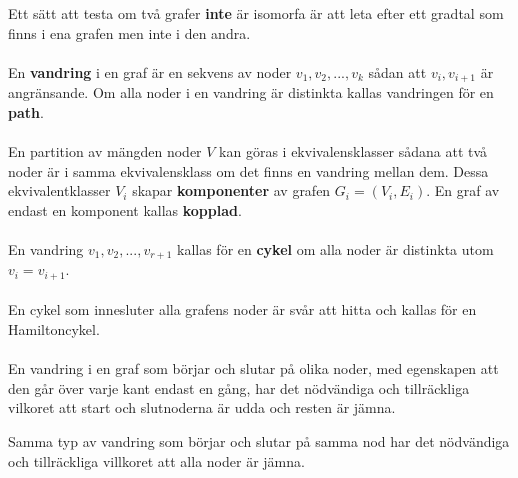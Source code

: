 \documentclass{article}
\begin{document}
Ett sätt att testa om två grafer \textbf{inte} är isomorfa är att leta efter ett gradtal som finns i ena grafen men inte i den andra.\\ \\ 
En \textbf{vandring} i en graf är en sekvens av noder $v_1,v_2,...,v_k$ sådan att $v_i,v_{i+1}$ är angränsande. Om alla noder i en vandring är distinkta kallas vandringen för en \textbf{path}.\\ \\ 
En partition av mängden noder $V$ kan göras i ekvivalensklasser sådana att två noder är i samma ekvivalensklass om det finns en vandring mellan dem. Dessa ekvivalentklasser $V_i$ skapar \textbf{komponenter} av grafen $G_i=(V_i,E_i)$. En graf av endast en komponent kallas \textbf{kopplad}.\\ \\ 
En vandring $v_1,v_2,...,v_{r+1}$ kallas för en \textbf{cykel} om alla noder är distinkta utom $v_i=v_{i+1}$.\\ \\ 
En cykel som innesluter alla grafens noder är svår att hitta och kallas för en Hamiltoncykel.\\ \\ 
En vandring i en graf som börjar och slutar på olika noder, med egenskapen att den går över varje kant endast en gång, har det nödvändiga och tillräckliga vilkoret att start och slutnoderna är udda och resten är jämna.

Samma typ av vandring som börjar och slutar på samma nod har det nödvändiga och tillräckliga villkoret att alla noder är jämna.
\end{document}
